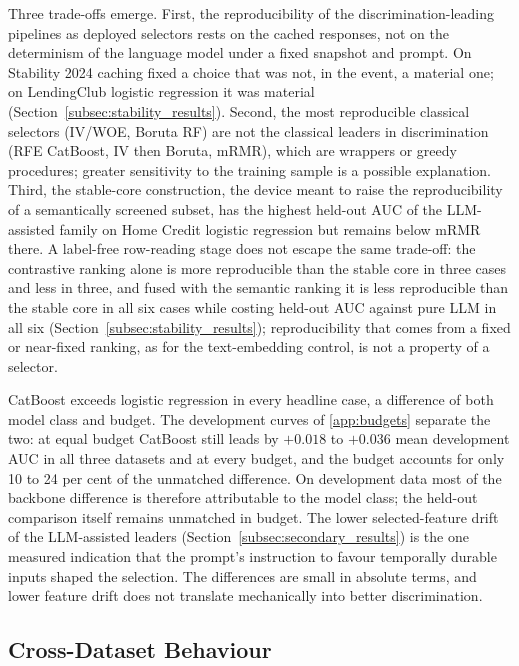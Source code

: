 \documentclass[final,5p,twocolumn]{elsarticle}
\begin{document}
Three trade-offs emerge. First, the reproducibility of the discrimination-leading pipelines as deployed selectors rests on the cached responses, not on the determinism of the language model under a fixed snapshot and prompt. On Stability 2024 caching fixed a choice that was not, in the event, a material one; on LendingClub logistic regression it was material (Section~\ref{subsec:stability_results}). Second, the most reproducible classical selectors (IV/WOE, Boruta RF) are not the classical leaders in discrimination (RFE CatBoost, IV then Boruta, mRMR), which are wrappers or greedy procedures; greater sensitivity to the training sample is a possible explanation. Third, the stable-core construction, the device meant to raise the reproducibility of a semantically screened subset, has the highest held-out AUC of the LLM-assisted family on Home Credit logistic regression but remains below mRMR there. A label-free row-reading stage does not escape the same trade-off: the contrastive ranking alone is more reproducible than the stable core in three cases and less in three, and fused with the semantic ranking it is less reproducible than the stable core in all six cases while costing held-out AUC against pure LLM in all six (Section~\ref{subsec:stability_results}); reproducibility that comes from a fixed or near-fixed ranking, as for the text-embedding control, is not a property of a selector.

CatBoost exceeds logistic regression in every headline case, a difference of both model class and budget. The development curves of \ref{app:budgets} separate the two: at equal budget CatBoost still leads by $+0.018$ to $+0.036$ mean development AUC in all three datasets and at every budget, and the budget accounts for only 10 to 24 per cent of the unmatched difference. On development data most of the backbone difference is therefore attributable to the model class; the held-out comparison itself remains unmatched in budget. The lower selected-feature drift of the LLM-assisted leaders (Section~\ref{subsec:secondary_results}) is the one measured indication that the prompt's instruction to favour temporally durable inputs shaped the selection. The differences are small in absolute terms, and lower feature drift does not translate mechanically into better discrimination.

\subsection{Cross-Dataset Behaviour}
\label{subsec:cross_dataset}
\end{document}
